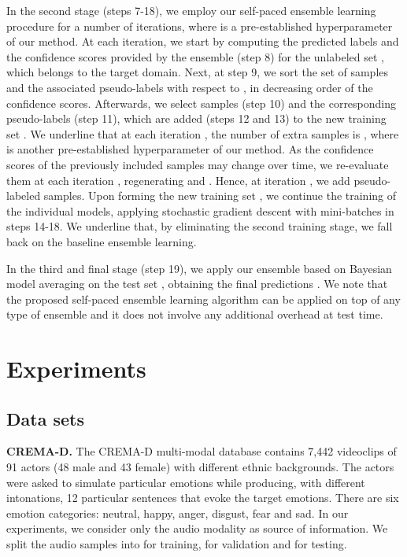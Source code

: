 \documentclass[a4paper]{article}
\begin{document}
In the second stage (steps 7-18), we employ our self-paced ensemble learning procedure for a number of  iterations, where  is a pre-established hyperparameter of our method. At each iteration, we start by computing the predicted labels  and the confidence scores  provided by the ensemble (step 8) for the unlabeled set , which belongs to the target domain. Next, at step 9, we sort the set of samples  and the associated pseudo-labels  with respect to , in decreasing order of the confidence scores. Afterwards, we select  samples (step 10) and the corresponding pseudo-labels (step 11), which are added (steps 12 and 13) to the new training set . We underline that at each iteration , the number of extra samples is , where  is another pre-established hyperparameter of our method. As the confidence scores of the previously included samples may change over time, we re-evaluate them at each iteration , regenerating  and . Hence, at iteration , we add  pseudo-labeled samples. Upon forming the new training set , we continue the training of the individual models, applying stochastic gradient descent with mini-batches in steps 14-18. We underline that, by eliminating the second training stage, we fall back on the baseline ensemble learning.

In the third and final stage (step 19), we apply our ensemble based on Bayesian model averaging on the test set , obtaining the final predictions . We note that the proposed self-paced ensemble learning algorithm can be applied on top of any type of ensemble and it does not involve any additional overhead at test time.

\section{Experiments}

\vspace{-0.1cm}
\subsection{Data sets}
\vspace{-0.1cm}

{\bf CREMA-D.}
The CREMA-D multi-modal database \cite{Cao-TAC-2014} contains 7,442 videoclips of 91 actors (48 male and 43 female) with different ethnic backgrounds. The actors were asked to simulate particular emotions while producing, with different intonations, 12 particular sentences that evoke the target emotions. There are six emotion categories: neutral, happy, anger, disgust, fear and sad. In our experiments, we consider only the audio modality as source of information. We split the audio samples into  for training,  for validation and  for testing.
\end{document}
